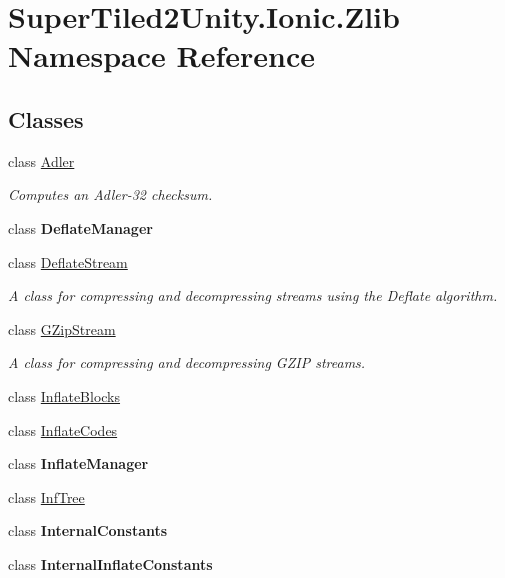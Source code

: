 \hypertarget{namespace_super_tiled2_unity_1_1_ionic_1_1_zlib}{}\section{Super\+Tiled2\+Unity.\+Ionic.\+Zlib Namespace Reference}
\label{namespace_super_tiled2_unity_1_1_ionic_1_1_zlib}
\subsection*{Classes}
\begin{DoxyCompactItemize}
\item 
class \mbox{\hyperlink{class_super_tiled2_unity_1_1_ionic_1_1_zlib_1_1_adler}{Adler}}
\begin{DoxyCompactList}\small\item\em Computes an Adler-\/32 checksum. \end{DoxyCompactList}\item 
class {\bfseries Deflate\+Manager}
\item 
class \mbox{\hyperlink{class_super_tiled2_unity_1_1_ionic_1_1_zlib_1_1_deflate_stream}{Deflate\+Stream}}
\begin{DoxyCompactList}\small\item\em A class for compressing and decompressing streams using the Deflate algorithm. \end{DoxyCompactList}\item 
class \mbox{\hyperlink{class_super_tiled2_unity_1_1_ionic_1_1_zlib_1_1_g_zip_stream}{G\+Zip\+Stream}}
\begin{DoxyCompactList}\small\item\em A class for compressing and decompressing G\+Z\+IP streams. \end{DoxyCompactList}\item 
class \mbox{\hyperlink{class_super_tiled2_unity_1_1_ionic_1_1_zlib_1_1_inflate_blocks}{Inflate\+Blocks}}
\item 
class \mbox{\hyperlink{class_super_tiled2_unity_1_1_ionic_1_1_zlib_1_1_inflate_codes}{Inflate\+Codes}}
\item 
class {\bfseries Inflate\+Manager}
\item 
class \mbox{\hyperlink{class_super_tiled2_unity_1_1_ionic_1_1_zlib_1_1_inf_tree}{Inf\+Tree}}
\item 
class {\bfseries Internal\+Constants}
\item 
class {\bfseries Internal\+Inflate\+Constants}

\end{DoxyCompactItemize}
